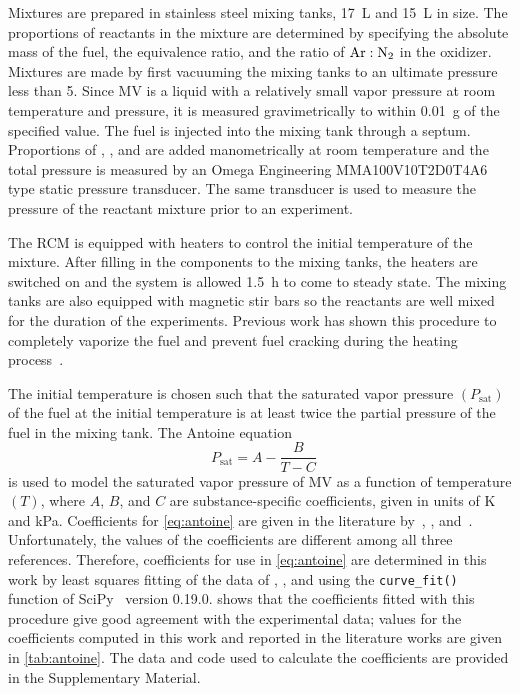 \documentclass[letterpaper, review, sort&compress]{elsarticle}
\newcommand*{\logten}{\mathop{\log_{10}}}
\begin{document}
Mixtures are prepared in stainless steel mixing tanks, \SI{17}{\L} and \SI{15}{\L} in size. The
proportions of reactants in the mixture are determined by specifying the absolute mass of the fuel,
the equivalence ratio, and the ratio of \(\ce{Ar}:\ce{N2}\) in the oxidizer. Mixtures are made by
first vacuuming the mixing tanks to an ultimate pressure less than \SI{5}{\torr}. Since MV is a
liquid with a relatively small vapor pressure at room temperature and pressure, it is measured
gravimetrically to within \SI{0.01}{\g} of the specified value. The fuel is injected into the mixing
tank through a septum. Proportions of , , and  are added manometrically at room
temperature and the total pressure is measured by an Omega Engineering MMA100V10T2D0T4A6 type static
pressure transducer. The same transducer is used to measure the pressure of the reactant mixture
prior to an experiment.

The RCM is equipped with heaters to control the initial temperature of the mixture. After filling in
the components to the mixing tanks, the heaters are switched on and the system is allowed
\SI{1.5}{\hour} to come to steady state. The mixing tanks are also equipped with magnetic stir bars
so the reactants are well mixed for the duration of the experiments. Previous work has shown this
procedure to completely vaporize the fuel and prevent fuel cracking during the heating
process~\cite{Weber2011a,Kumar2009,Das2012}.

The initial temperature is chosen such that the saturated vapor pressure \((P_{\text{sat}})\) of the
fuel at the initial temperature is at least twice the partial pressure of the fuel in the mixing
tank. The Antoine equation
%
\begin{equation}\label{eq:antoine}
    \logten{P_{\text{sat}}} = A - \frac{B}{T - C}
\end{equation}
%
is used to model the saturated vapor pressure of MV as a function of temperature \((T)\), where
\(A\), \(B\), and \(C\) are substance-specific coefficients, given in units of \si{\kelvin} and
\si{\kPa}. Coefficients for \cref{eq:antoine} are given in the literature by~\citet{Ortega2003},
\citet{Camacho2007}, and~\citet{Stephenson1987}. Unfortunately, the values of the coefficients are
different among all three references. Therefore, coefficients for use in \cref{eq:antoine} are
determined in this work by least squares fitting of the data of \citet{Ortega2003},
\citet{vanGenderen2002}, and \citet{Verevkin2008} using the \verb|curve_fit()| function of
SciPy~\cite{Jones2001} version 0.19.0.  shows that the coefficients fitted
with this procedure give good agreement with the experimental data; values for the coefficients
computed in this work and reported in the literature works are given in \cref{tab:antoine}. The data
and code used to calculate the coefficients are provided in the Supplementary Material.
\end{document}
